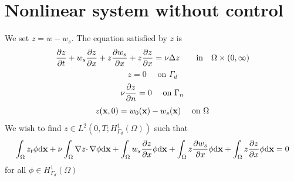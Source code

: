 \documentclass[12pt]{article}
\begin{document}
% 
\section{Nonlinear system without control}
We set $z = w - w_s$. The equation satisfied by $z$ is
\begin{equation*}
\frac{\partial z}{\partial t} + w_s \frac{\partial z}{\partial x} + z \frac{\partial w_s}{\partial x} + z \frac{\partial z}{\partial x} = \nu \Delta z \qquad \mbox{in} \quad \Omega \times (0,\infty)
\end{equation*}
\begin{equation*}
z = 0 \quad \text{ on } \Gamma_d 
\end{equation*}
\begin{equation*}
\nu \frac{\partial z}{\partial n} = 0 \quad \text{ on } \Gamma_n 
\end{equation*}
\begin{equation*}
z({\mathbf x},0) = w_0({\mathbf x}) - w_s({\mathbf x}) \quad \text{ on } \Omega
\end{equation*}
We wish to find $z \in L^2(0,T;H^1_{\Gamma_d}(\Omega))$ such that
\[
\int_\Omega z_t \phi \textrm{d} {\mathbf x} + \nu \int_\Omega \nabla{z} \cdotp \nabla \phi \textrm{d} {\mathbf x} + \int_\Omega w_s \frac{\partial z}{\partial x} \phi \textrm{d} {\mathbf x} + \int_\Omega z \frac{\partial w_s}{\partial x} \phi \textrm{d} {\mathbf x} + \int_\Omega z \frac{\partial z}{\partial x} \phi \textrm{d} {\mathbf x} = 0
\]
for all $\phi \in H^1_{\Gamma_d}(\Omega)$
\end{document}
